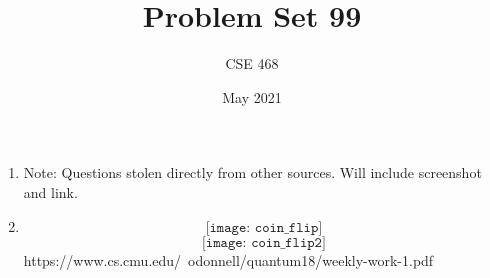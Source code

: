 \documentclass[12pt]{article}
\title{Problem Set 99}
\author{CSE 468}
\date{May 2021}
\begin{document}
\maketitle



\begin{enumerate}[font=\bfseries]

    \item Note: Questions stolen directly from other sources. Will include screenshot and link.
    \item \[\texttt{[image: coin\_flip]}\]
    \[\texttt{[image: coin\_flip2]}\]
    https://www.cs.cmu.edu/~odonnell/quantum18/weekly-work-1.pdf
    
    
\end{enumerate}
\end{document}
